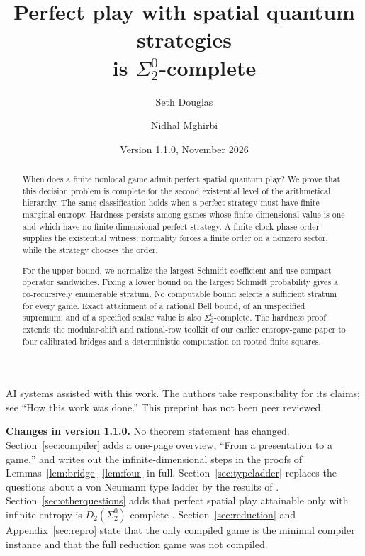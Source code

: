\documentclass[11pt,a4paper]{article}
\title{Perfect play with spatial quantum strategies\\ is $\Sigma^0_2$-complete}
\author{Seth Douglas \and Nidhal Mghirbi}
\date{Version 1.1.0, November 2026}
\theoremstyle{remark}
\begin{document}
\maketitle
\begin{abstract}
When does a finite nonlocal game admit perfect spatial quantum play? We prove that this decision problem is complete for the second existential level of the arithmetical hierarchy. The same classification holds when a perfect strategy must have finite marginal entropy. Hardness persists among games whose finite-dimensional value is one and which have no finite-dimensional perfect strategy. A finite clock-phase order supplies the existential witness: normality forces a finite order on a nonzero sector, while the strategy chooses the order.

For the upper bound, we normalize the largest Schmidt coefficient and use compact operator sandwiches. Fixing a lower bound on the largest Schmidt probability gives a co-recursively enumerable stratum. No computable bound selects a sufficient stratum for every game. Exact attainment of a rational Bell bound, of an unspecified supremum, and of a specified scalar value is also $\Sigma^0_2$-complete. The hardness proof extends the modular-shift and rational-row toolkit of our earlier entropy-game paper to four calibrated bridges and a deterministic computation on rooted finite squares.
\end{abstract}
\begin{center}\small AI systems assisted with this work. The authors take responsibility for its claims; see ``How this work was done.'' This preprint has not been peer reviewed.\end{center}
\begin{center}\small
\begin{minipage}{0.92\linewidth}
\textbf{Changes in version 1.1.0.} No theorem statement has changed. Section~\ref{sec:compiler} adds a one-page overview, ``From a presentation to a game,'' and writes out the infinite-dimensional steps in the proofs of Lemmas~\ref{lem:bridge}--\ref{lem:four} in full. Section~\ref{sec:typeladder} replaces the questions about a von Neumann type ladder by the results of \cite{ReadType,Hyperfinite,TypeLadder}. Section~\ref{sec:otherquestions} adds that perfect spatial play attainable only with infinite entropy is $D_2(\Sigma^0_2)$-complete \cite{TypeLadder}. Section~\ref{sec:reduction} and Appendix~\ref{sec:repro} state that the only compiled game is the minimal compiler instance and that the full reduction game was not compiled.
\end{minipage}
\end{center}
\clearpage
{\small\tableofcontents}
\clearpage











\appendix



\end{document}
